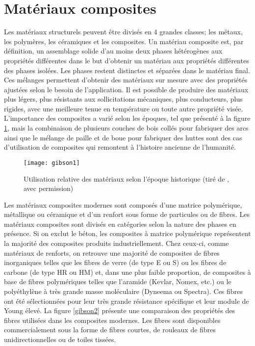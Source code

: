 \label{sec:RevLitt}

\section{Matériaux composites}

Les matériaux structurels peuvent être divisés en 4 grandes classes; les métaux, les polymères, les céramiques et les composites. 
Un matériau composite est, par définition, un assemblage solide d'au moins deux phases hétérogènes aux propriétés différentes dans le but d'obtenir un matériau aux propriétés différentes des phases isolées. 
Les phases restent distinctes et séparées dans le matériau final. 
Ces mélanges permettent d'obtenir des matériaux sur mesure avec des propriétés ajustées selon le besoin de l'application. 
Il est possible de produire des matériaux plus légers, plus résistants aux sollicitations mécaniques, plus conducteurs, plus rigides, avec une meilleure tenue en température ou toute autre propriété visée. 
L'importance des composites a varié selon les époques, tel que présenté à la figure \ref{gibson1}, mais la combinaison de plusieurs couches de bois collés pour fabriquer des arcs ainsi que le mélange de paille et de boue pour fabriquer des huttes sont des cas d'utilisation de composites qui remontent à l'histoire ancienne de l'humanité. 

\begin{figure}
	\centering
	\texttt{[image: gibson1]}
	\caption{Utilisation relative des matériaux selon l'époque historique (tiré de \cite{Ashby1987}, avec permission)}
	\label{gibson1}
\end{figure}

Les matériaux composites modernes sont composés d'une matrice polymérique, métallique ou céramique et d'un renfort sous forme de particules ou de fibres. 
Les matériaux composites sont divisés en catégories selon la nature des phases en présence. 
Si on exclut le béton, les composites à matrice polymérique représentent la majorité des composites produits industriellement. 
Chez ceux-ci, comme matériaux de renforts, on retrouve une majorité de composites de fibres inorganiques telles que les fibres de verre (de type E ou S) ou les fibres de carbone (de type HR ou HM) et, dans une plus faible proportion, de composites à base de fibres polymériques telles que l'aramide (Kevlar, Nomex, etc.) ou le polyéthylène à très grande masse moléculaire (Dyneema ou Spectra). 
Ces fibres ont été sélectionnées pour leur très grande résistance spécifique et leur module de Young élevé. 
La figure \ref{gibson2} présente une comparaison des propriétés des fibres utilisées dans les composites modernes. 
Les fibres sont disponibles commercialement sous la forme de fibres courtes, de rouleaux de fibres unidirectionnelles ou de toiles tissées. 

